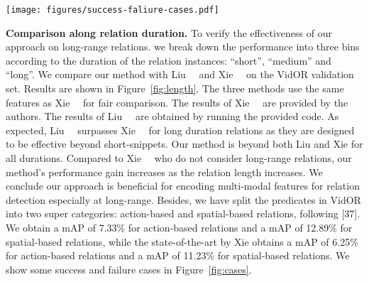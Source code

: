 \documentclass[10pt,twocolumn,letterpaper]{article}
\begin{document}
\begin{figure*}[htb!]
\centering
\texttt{[image: figures/success-faliure-cases.pdf]}
\vspace{-0.6cm}
  \caption{
\textbf{Success and failure cases} on VidOR. For the left example, we detect all the ground truth relation instances and successfully predict the long-range relation \texttt{chase}. The middle case needs temporal context information to detect an adult cleaning a horse. Our method's detection proves its ability to detect long-range relations. In the right example, our approach detects \texttt{behind} and \texttt{toward} relations. But since the object detector wrongly recognizes \texttt{car} as \texttt{truck}, the final triplet predictions are wrong even though the relation predicates are correct. Incorrect object categories also lead to imprecise semantic features, which may contribute to the missing of a relation prediction. We provide more qualitative results and example videos with success and failure in the supplemental material.
}
\label{fig:cases}
\end{figure*}


\textbf{Comparison along relation duration.} To verify the effectiveness of our approach on long-range relations. we break down the performance into three bins according to the duration of the relation instances: ``short'', ``medium'' and ``long''. We compare our method with Liu~\etal~\cite{liu2020beyond} and Xie~\etal~\cite{xie2020video} on the VidOR validation set. Results are shown in Figure~\ref{fig:length}. The three methods use the same features as Xie~\etal~\cite{xie2020video} for fair comparison. The results of Xie~\etal~\cite{xie2020video} are provided by the authors. The results of Liu~\etal~\cite{liu2020beyond} are obtained by running the provided code.
As expected, Liu~\etal~\cite{liu2020beyond} surpasses Xie~\etal~\cite{xie2020video} for long duration relations as they are designed to be effective beyond short-snippets. Our method is beyond both Liu \etal and Xie \etal for all durations. Compared to Xie~\etal~\cite{xie2020video} who do not consider long-range relations, our method's performance gain increases as the relation length increases. We conclude our approach is beneficial for encoding multi-modal features for relation detection especially at long-range. Besides, we have split the predicates in VidOR into two super categories: action-based and spatial-based relations, following [37]. We obtain a mAP of 7.33\% for action-based relations and a mAP of 12.89\% for spatial-based relations, while the state-of-the-art by Xie 
\etal [51] obtains a mAP of 6.25\% for action-based relations and a mAP of 11.23\% for spatial-based relations.
We show some success and failure cases in Figure~\ref{fig:cases}.
\end{document}
